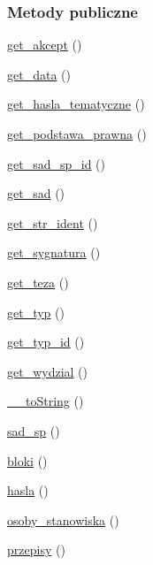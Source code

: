 \subsubsection*{Metody publiczne}
\begin{DoxyCompactItemize}
\item 
\hyperlink{classep___s_p___orzeczenie_a76d66bf9d593a034ae91951dcfb8596c}{get\-\_\-akcept} ()
\item 
\hyperlink{classep___s_p___orzeczenie_ab5976d1ba325a739761c2eb6662f58a9}{get\-\_\-data} ()
\item 
\hyperlink{classep___s_p___orzeczenie_a48c2554be87c9d1d5d2007426b6e7078}{get\-\_\-hasla\-\_\-tematyczne} ()
\item 
\hyperlink{classep___s_p___orzeczenie_a1fdcf85a8e95be9b40da82735dd4a325}{get\-\_\-podstawa\-\_\-prawna} ()
\item 
\hyperlink{classep___s_p___orzeczenie_a4cc0af051119b86c2a7c1cf7f46c8fa3}{get\-\_\-sad\-\_\-sp\-\_\-id} ()
\item 
\hyperlink{classep___s_p___orzeczenie_a61ac3997aeddb982bdd7895dc272a20a}{get\-\_\-sad} ()
\item 
\hyperlink{classep___s_p___orzeczenie_a3c54f5f55e5023ca7ce3e284a91d17ce}{get\-\_\-str\-\_\-ident} ()
\item 
\hyperlink{classep___s_p___orzeczenie_a2816085ef7f03472a9c8aaf65df2d6d5}{get\-\_\-sygnatura} ()
\item 
\hyperlink{classep___s_p___orzeczenie_a682b834334df7ce9d39ac07be04c03e6}{get\-\_\-teza} ()
\item 
\hyperlink{classep___s_p___orzeczenie_ad1992740551b9c2895616d62fd551a3f}{get\-\_\-typ} ()
\item 
\hyperlink{classep___s_p___orzeczenie_a4b45567d267edbb1938513035022bf89}{get\-\_\-typ\-\_\-id} ()
\item 
\hyperlink{classep___s_p___orzeczenie_a5707ecfa38e5c684b1916f810faec796}{get\-\_\-wydzial} ()
\item 
\hyperlink{classep___s_p___orzeczenie_a7516ca30af0db3cdbf9a7739b48ce91d}{\-\_\-\-\_\-to\-String} ()
\item 
\hyperlink{classep___s_p___orzeczenie_a938cd0e29c0e27685e0402857cf681e7}{sad\-\_\-sp} ()
\item 
\hyperlink{classep___s_p___orzeczenie_ac6344ab36289e3d6b79a0fdae42d2146}{bloki} ()
\item 
\hyperlink{classep___s_p___orzeczenie_a5aa6a641a9d13bc9350ba92b07680244}{hasla} ()
\item 
\hyperlink{classep___s_p___orzeczenie_aeed2d21ed1c7ed38d96e4ff27dead9cd}{osoby\-\_\-stanowiska} ()
\item 
\hyperlink{classep___s_p___orzeczenie_a5a7fd63e53799ac8f60829be1adc37e1}{przepisy} ()
\end{DoxyCompactItemize}
